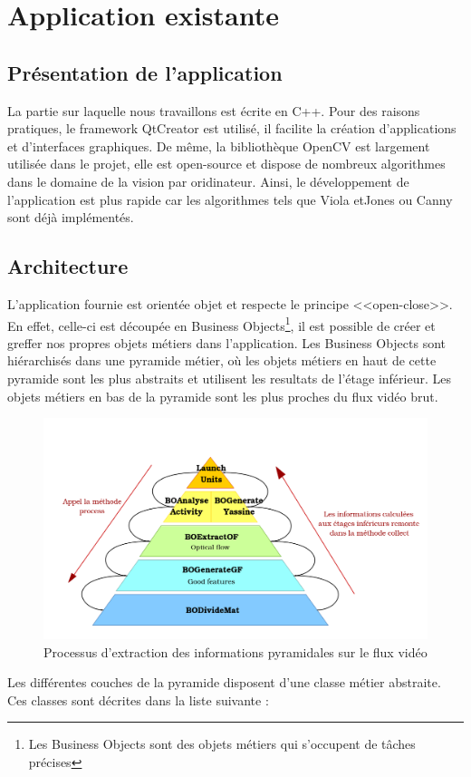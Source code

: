 \section{Application existante}

\subsection{Présentation de l'application}
La partie sur laquelle nous travaillons est écrite en C++. Pour des raisons pratiques, le framework 
QtCreator est utilisé, il facilite la création d'applications et d'interfaces graphiques. De même, 
la bibliothèque OpenCV  est largement utilisée dans le projet, elle est open-source et dispose de 
nombreux algorithmes dans le domaine de la vision par oridinateur. Ainsi, le développement de 
l'application est plus rapide car les algorithmes tels que Viola etJones ou Canny sont déjà implémentés.

\subsection{Architecture}
L'application fournie est orientée objet et respecte le principe <<open-close>>. En effet, celle-ci est 
découpée en Business Objects\footnote{Les Business Objects sont des objets métiers qui s'occupent de tâches 
précises}, il est possible de créer et greffer nos propres objets métiers dans l'application. Les Business 
Objects sont hiérarchisés dans une pyramide métier, où les objets métiers en haut de cette pyramide 
sont les plus abstraits et utilisent les resultats de l'étage inférieur. Les objets métiers en bas de 
la pyramide sont les plus proches du flux vidéo brut.\\

\begin{figure}[H]
  \centering
  \includegraphics[width=15cm]{image/pyramide.png}
  \caption{Processus d'extraction des informations pyramidales sur le flux vidéo}
\end{figure}
\newpage
Les différentes couches de la pyramide disposent d'une classe métier abstraite. Ces classes 
sont décrites dans la liste suivante :\\

